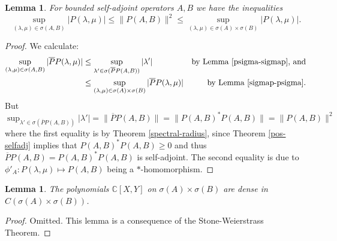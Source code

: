 \documentclass[12pt,oneside]{report}
\newtheorem{lem}[thm]{Lemma}
\begin{document}
\begin{lem}\label{spectral-ub}
    For bounded self-adjoint operators $A,B$ we have the inequalities$$\sup_{(\lambda,\mu) \in \sigma(A,B)} |P(\lambda,\mu)| \le \|P(A,B)\|^{2} \le \sup_{(\lambda,\mu) \in \sigma(A)\times\sigma(B)} |P(\lambda,\mu)|.$$
\end{lem}
\begin{proof}
    We calculate:
    \begin{align*}
        \sup_{(\lambda,\mu) \in \sigma(A,B)} |\overline{P}P(\lambda,\mu)|
        &\leq \sup_{\lambda' \in \sigma(\overline{P}P(A,B))} |\lambda'| & \text{by Lemma \ref{psigma-sigmap}, and} \\
        &\leq \sup_{(\lambda,\mu) \in \sigma(A) \times \sigma(B)} |\overline{P}P(\lambda,\mu)| & \text{by Lemma \ref{sigmap-psigma}}.
    \end{align*}
    But $\sup_{\lambda' \in \sigma(\overline{P}P(A,B))} |\lambda'| = \|\overline{P}P(A,B)\| = \|P(A,B)^{*}P(A,B)\| = \|P(A,B)\|^{2}$ where the first equality is by Theorem \ref{spectral-radius}, since Theorem \ref{pos-selfadj} implies that $P(A,B)^{*}P(A,B) \geq 0$ and thus $\overline{P}P(A,B) = P(A,B)^{*}P(A,B)$ is self-adjoint. The second equality is due to $\phi'_{A} : P(\lambda,\mu) \mapsto P(A,B)$ being a $*$-homomorphism.

\end{proof}

\begin{lem}
    The polynomials $\mathbb{C}[X,Y]$ on $\sigma(A) \times \sigma (B)$ are dense in $C(\sigma(A) \times \sigma(B))$.
\end{lem}
\begin{proof}
    Omitted. This lemma is a consequence of the Stone-Weierstrass Theorem.
\end{proof}
\end{document}
